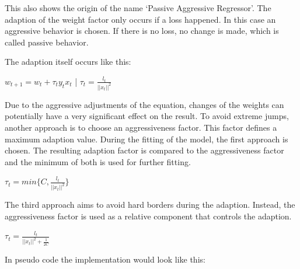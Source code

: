 \documentclass[sigconf]{acmart}
\begin{document}
This also shows the origin of the name `Passive Aggressive Regressor'. The adaption of the weight factor only occurs if a loss happened. In this case an aggressive behavior is chosen. If there is no loss, no change is made, which is called passive behavior.

The adaption itself occurs like this:

\begin{center}
$w_{t+1} = w_{t} + \tau_{t}y_{t}x_{t}$ | $\tau_t = \frac{l_t}{||x_t||^2}$
\end{center}

Due to the aggressive adjustments of the equation, changes of the weights can potentially have a very significant effect on the result. To avoid extreme jumps, another approach is to choose an aggressiveness factor. This factor defines a maximum adaption value. During the fitting of the model, the first approach is chosen. The resulting adaption factor is compared to the aggressiveness factor and the minimum of both is used for further fitting.\\

\begin{center}
$\tau_t = min\{C, \frac{l_t}{||x_t||^2}\}$\\
\end{center}

The third approach aims to avoid hard borders during the adaption. Instead, the aggressiveness factor is used as a relative component that controls the adaption.\\

\begin{center}
$\tau_t = \frac{l_t}{||x_t||^2 + \frac{1}{2C}}$\\
\end{center}

In pseudo code the implementation would look like this:\\
\end{document}
